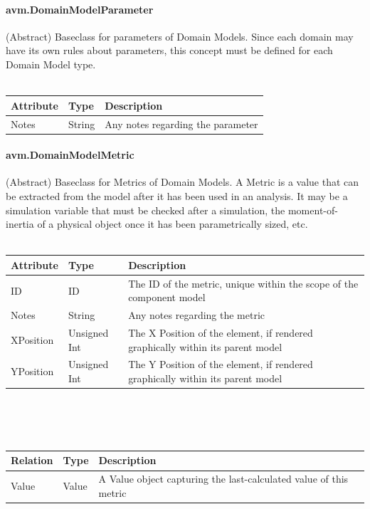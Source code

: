 \paragraph{avm.DomainModelParameter}
(Abstract) Baseclass for parameters of Domain Models. Since each domain may have its own rules about parameters, this concept must be defined for each Domain Model type.
\\ \\
\begin{tabular}{ l l p{12cm} }
\textbf{Attribute} & \textbf{Type} & \textbf{Description} \\ \hline
Notes & String & Any notes regarding the parameter \\ \hline
\end{tabular}

\paragraph{avm.DomainModelMetric}
(Abstract) Baseclass for Metrics of Domain Models. A Metric is a value that can be extracted from the model after it has been used in an analysis. It may be a simulation variable that must be checked after a simulation, the moment-of-inertia of a physical object once it has been parametrically sized, etc.
\\ \\
\begin{tabular}{ l l p{12cm} }
\textbf{Attribute} & \textbf{Type} & \textbf{Description} \\ \hline
ID & ID & The ID of the metric, unique within the scope of the component model \\ \hline
Notes & String & Any notes regarding the metric \\ \hline
XPosition & Unsigned Int & The X Position of the element, if rendered graphically within its parent model \\ \hline
YPosition & Unsigned Int & The Y Position of the element, if rendered graphically within its parent model \\ \hline
\end{tabular}
\\ \\ \\
\begin{tabular}{ l l p{12cm} }
\textbf{Relation} & \textbf{Type} & \textbf{Description} \\ \hline
Value & Value & A Value object capturing the last-calculated value of this metric \\ \hline
\end{tabular}


